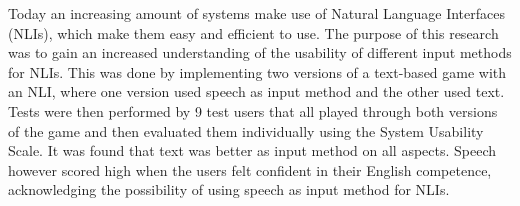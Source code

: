 Today an increasing amount of systems make use of Natural Language Interfaces (NLIs), which make them easy and efficient to use. The purpose of this research was to gain an increased understanding of the usability of different input methods for NLIs. This was done by implementing two versions of a text-based game with an NLI, where one version used speech as input method and the other used text. Tests were then performed by 9 test users that all played through both versions of the game and then evaluated them individually using the System Usability Scale. It was found that text was better as input method on all aspects. Speech however scored high when the users felt confident in their English competence, acknowledging the possibility of using speech as input method for NLIs.
